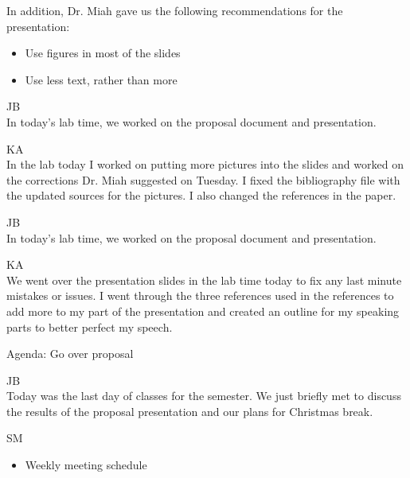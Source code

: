 \documentclass[fontsize=11pt, %
                             paper=letter, %
                             openany, %
                             captions=tableheading,
                             index=totoc,
                             hyperref]{labbook}
\begin{document}
\begin{addmargin}[0cm]{0cm}
In addition, Dr. Miah gave us the following recommendations for the presentation:
\begin{itemize}
    \item Use figures in most of the slides
    \item Use less text, rather than more
\end{itemize}



JB\\
In today's lab time, we worked on the proposal document and presentation.

\vspace*{12pt}
KA\\
In the lab today I worked on putting more pictures into the slides and worked on the corrections Dr. Miah suggested on Tuesday. I fixed the bibliography file with the updated sources for the pictures. I also changed the references in the paper.



JB\\
In today's lab time, we worked on the proposal document and presentation.

\vspace*{12pt}
KA\\
We went over the presentation slides in the lab time today to fix any last minute mistakes or issues. I went through the three references used in the references to add more to my part of the presentation and created an outline for my speaking parts to better perfect my speech.

Agenda: Go over proposal



JB\\
Today was the last day of classes for the semester. We just briefly met to
discuss the results of the proposal presentation and our plans for Christmas
break.


SM\\
\begin{itemize}
  \item Weekly meeting schedule


\end{itemize}
\end{addmargin}
\end{document}
